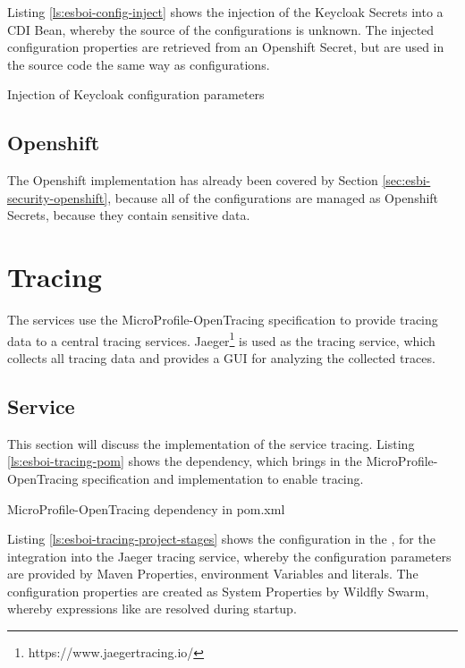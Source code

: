 Listing \vref{ls:esboi-config-inject} shows the injection of the Keycloak Secrets into a CDI Bean, whereby the source of the configurations is unknown. The injected configuration properties are retrieved from an Openshift Secret, but are used in the source code the same way as configurations.

\begin{listing}[h]
	\caption{Injection of Keycloak configuration parameters}
	\label{ls:esboi-config-inject}
\end{listing}

\subsection{Openshift}
\label{sec:esbi-config-openshift}
The Openshift implementation has already been covered by Section \vref{sec:esbi-security-openshift}, because all of the configurations are managed as Openshift Secrets, because they contain sensitive data. 

\section{Tracing}
\label{sec:esbi-tracing}
The services use the MicroProfile-OpenTracing specification to provide tracing data to a central tracing services. Jaeger\footnote{https://www.jaegertracing.io/} is used as the tracing service, which collects all tracing data and provides a GUI for analyzing the collected traces. 

\subsection{Service}
\label{sec:esbi-tracing-service}
This section will discuss the implementation of the service tracing. Listing \vref{ls:esboi-tracing-pom} shows the dependency, which brings in the MicroProfile-OpenTracing specification and implementation to enable tracing. 

\begin{listing}[h]
	\caption{MicroProfile-OpenTracing dependency in pom.xml}
	\label{ls:esboi-tracing-pom}
\end{listing}

Listing \vref{ls:esboi-tracing-project-stages} shows the configuration  in the , for the integration into the Jaeger tracing service, whereby the configuration parameters are provided by Maven Properties, environment Variables and literals. The configuration properties are created as System Properties by Wildfly Swarm, whereby  expressions like  are resolved during startup.


